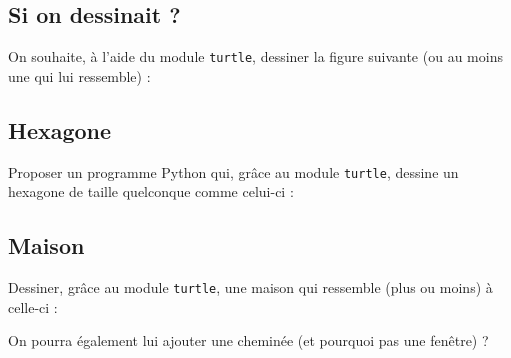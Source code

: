 \documentclass[12pt,a4paper, oneside]{article}
\theoremstyle{definition}
\begin{document}
   \subsection{Si on dessinait ?}\label{subsec:si-on-dessinait-?}
      On souhaite, à l'aide du module \texttt{turtle}, dessiner la figure suivante (ou au moins une qui lui ressemble) :
   \begin{center}
   \end{center}
   
   \subsection{Hexagone}\label{subsec:hexagone}
   Proposer un programme Python qui, grâce au module \texttt{turtle}, dessine un hexagone de taille quelconque comme celui-ci :
   \begin{center}
   \end{center}

   \subsection{Maison}\label{subsec:maison}
      Dessiner, grâce au module \texttt{turtle}, une maison qui ressemble (plus ou moins) à celle-ci :
   \begin{center}
   \end{center}

   On pourra également lui ajouter une cheminée (et pourquoi pas une fenêtre) ?
   
\end{document}
